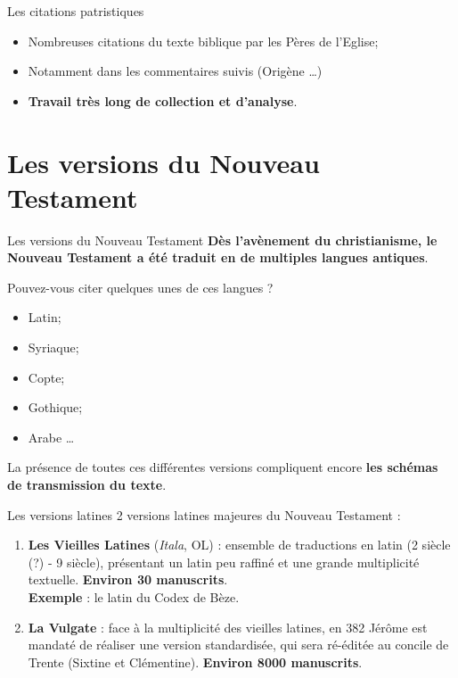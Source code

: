 \documentclass[11pt]{beamer}
\begin{document}
\begin{frame}{Les citations patristiques}
\begin{itemize}
    \item Nombreuses citations du texte biblique par les Pères de l'Eglise;
    \item Notamment dans les commentaires suivis (Origène \dots)
    \item \textbf{Travail très long de collection et d'analyse}.
\end{itemize}
    
\end{frame}

\section{Les versions du Nouveau Testament}

\begin{frame}{Les versions du Nouveau Testament}
    \textbf{Dès l'avènement du christianisme, le Nouveau Testament a été traduit en de multiples langues antiques}.

    \begin{block}{}
        Pouvez-vous citer quelques unes de ces langues ?
        \pause
        \begin{itemize}
            \item Latin;
            \item Syriaque;
            \item Copte;
            \item Gothique;
            \item Arabe \dots
        \end{itemize}
    \end{block}
    \pause
    
    \begin{alertblock}{}
La présence de toutes ces différentes versions compliquent encore \textbf{les schémas de transmission du texte}.
    \end{alertblock}
\end{frame}

\begin{frame}{Les versions latines}
    2 versions latines majeures du Nouveau Testament :

    \begin{enumerate}
        \item \textbf{Les Vieilles Latines} (\textit{Itala}, OL) : ensemble de traductions en latin (2 \ieme{} siècle (?) - 9\ieme{} siècle), présentant un latin peu raffiné et une grande multiplicité textuelle. \textbf{Environ 30 manuscrits}.\\
        \textbf{Exemple} : le latin du Codex de Bèze.\\
        \pause
        
        \item \textbf{La Vulgate} : face à la multiplicité des vieilles latines, en 382 Jérôme est mandaté de réaliser une version standardisée, qui sera ré-éditée au concile de Trente (Sixtine et Clémentine). \textbf{Environ 8000 manuscrits}.\\
    \end{enumerate}
\end{frame}
\end{document}
